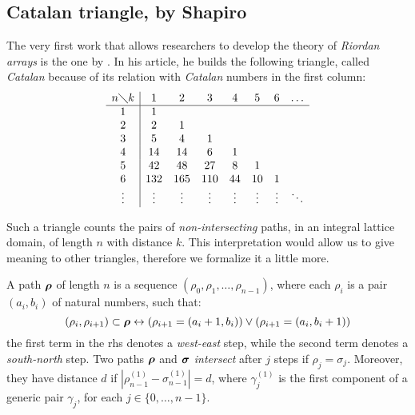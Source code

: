 
\subsection{Catalan triangle, by Shapiro}

The very first work that allows researchers to develop the theory of
\emph{Riordan arrays} is the one by \citeauthor{shapiro:1976}
\cite{shapiro:1976}. In his article, he builds the following triangle, called
\emph{Catalan} because of its relation with \emph{Catalan} numbers in the first
column:
\begin{equation}
    \begin{array}{c|ccccccc}
        n\diagdown k & 1 & 2 & 3 & 4 & 5 & 6&\ldots\\
        \hline
        1&1 & & & & & &\\
        2&2 &1 & & & & &\\
        3&5 &4 &1 & & & &\\
        4&14 &14 &6 &1 & & &\\
        5&42 &48 &27 &8 &1 & &\\
        6&132 &165 &110 &44 &10 &1& \\
        \vdots&\vdots&\vdots&\vdots&\vdots&\vdots&\vdots&\ddots \\
    \end{array}
\end{equation}

Such a triangle counts the pairs of \emph{non-intersecting} paths, in an
integral lattice domain, of length $n$ with distance $k$. This interpretation
would allow us to give meaning to other triangles, 
therefore we formalize it a little more.

A path $\boldsymbol{\rho}$ of length $n$ is a sequence $(\rho_{0},\rho_{1},\ldots,\rho_{n-1})$,
where each $\rho_{i}$ is a pair $(a_{i},b_{i})$ of natural numbers, such that:
\begin{displaymath}
    (\rho_{i},\rho_{i+1})\subset\boldsymbol{\rho} \leftrightarrow
    (\rho_{i+1}=(a_{i}+1,b_{i})) \vee 
    (\rho_{i+1}=(a_{i},b_{i}+1)) 
\end{displaymath}
the first term in the \ac{rhs} denotes a \emph{west-east} step, while the second
term denotes a \emph{south-north} step. Two paths $\boldsymbol{\rho}$ and $\boldsymbol{\sigma}$
\emph{intersect} after $j$ steps if $\rho_{j}=\sigma_{j}$. Moreover, they have distance
$d$ if $\left|\rho_{n-1}^{(1)}-\sigma_{n-1}^{(1)}\right|=d$, where $\gamma_{j}^{(1)}$ is
the first component of a generic pair $\gamma_{j}$, for each $j\in\lbrace0,\ldots,n-1\rbrace$.

